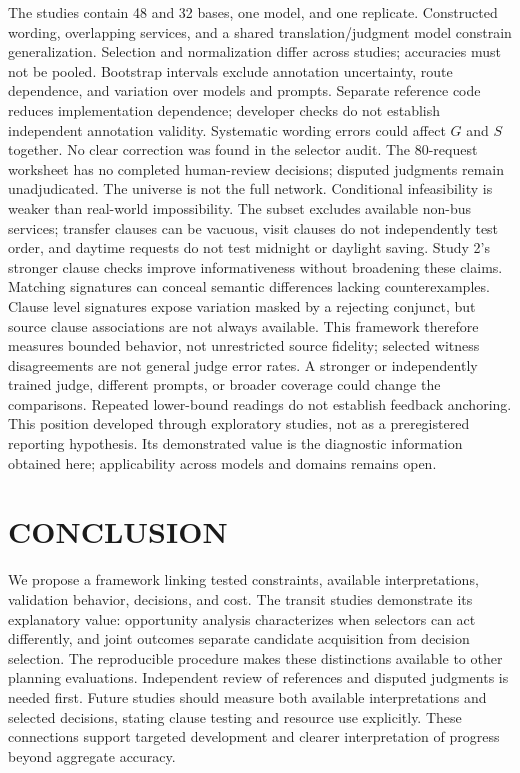 \documentclass[a4paper,twoside]{article}
\begin{document}
\noindent The studies contain 48 and 32 bases, one model, and one replicate. Constructed wording, overlapping services, and a shared translation/judgment model constrain generalization. Selection and normalization differ across studies; accuracies must not be pooled. Bootstrap intervals exclude annotation uncertainty, route dependence, and variation over models and prompts.
Separate reference code reduces implementation dependence; developer checks do not establish independent annotation validity. Systematic wording errors could affect $G$ and $S$ together. No clear correction was found in the selector audit. The 80-request worksheet has no completed human-review decisions; disputed judgments remain unadjudicated.
The universe is not the full network. Conditional infeasibility is weaker than real-world impossibility. The subset excludes available non-bus services; transfer clauses can be vacuous, visit clauses do not independently test order, and daytime requests do not test midnight or daylight saving. Study 2's stronger clause checks improve informativeness without broadening these claims.
Matching signatures can conceal semantic differences lacking counterexamples. Clause level signatures expose variation masked by a rejecting conjunct, but source clause associations are not always available. This framework therefore measures bounded behavior, not unrestricted source fidelity; selected witness disagreements are not general judge error rates.
A stronger or independently trained judge, different prompts, or broader coverage could change the comparisons. Repeated lower-bound readings do not establish feedback anchoring. This position developed through exploratory studies, not as a preregistered reporting hypothesis. Its demonstrated value is the diagnostic information obtained here; applicability across models and domains remains open.



\section{\uppercase{Conclusion}}
\label{sec:conclusion}

\noindent We propose a framework linking tested constraints, available interpretations, validation behavior, decisions, and cost. The transit studies demonstrate its explanatory value: opportunity analysis characterizes when selectors can act differently, and joint outcomes separate candidate acquisition from decision selection. The reproducible procedure makes these distinctions available to other planning evaluations. Independent review of references and disputed judgments is needed first. Future studies should measure both available interpretations and selected decisions, stating clause testing and resource use explicitly. These connections support targeted development and clearer interpretation of progress beyond aggregate accuracy.
\end{document}
